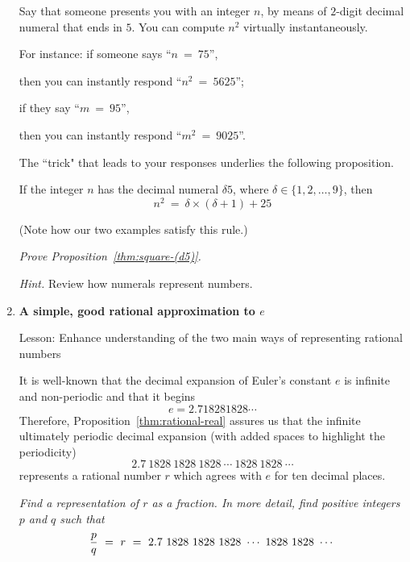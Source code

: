 \begin{enumerate}
\medskip

Say that someone presents you with an integer $n$, by means of $2$-digit decimal numeral that ends in $5$.  You can compute $n^2$ virtually instantaneously.  

\smallskip

For instance: if someone says ``$n \ = \ 75$'',

\hspace{.25in}then you can instantly respond ``$n^2 \ = \ 5625$'';

if they say ``$m \ = \ 95$'',

\hspace{.25in}then you can instantly respond ``$m^2 \ = \ 9025$''.

\medskip

The ``trick" that leads to your responses underlies the following proposition.

\begin{prop}
\label{thm:square-(d5)}
If the integer $n$ has the decimal numeral $\delta 5$, where $\delta \in \{1, 2, \ldots, 9\}$, then 
\[ n^2 \ = \ \delta \times (\delta+1) +25 \]
\end{prop}

(Note how our two examples satisfy this rule.)

\medskip

{\em Prove Proposition~\ref{thm:square-(d5)}.}

\smallskip

\textit{Hint.}
Review how numerals represent numbers.


\item
{\bf A simple, good rational approximation to $e$}

{\sc Lesson:} Enhance understanding of the two main ways of representing rational numbers

\smallskip

It is well-known that the decimal expansion of Euler's constant $e$ is infinite and non-periodic and that it begins
\[ e = 2.718281828 \cdots \]  
Therefore, Proposition~\ref{thm:rational-real} assures us that the infinite ultimately periodic decimal expansion (with added spaces to highlight the periodicity)
\[ 2.7 \ 1828 \ 1828 \ 1828 \ \cdots \ 1828 \ 1828 \ \cdots   \]
represents a rational number $r$ which agrees with $e$ for ten decimal places.

\smallskip

{\em Find a representation of $r$ as a fraction.  In more detail, find positive integers $p$ and $q$ such that}
\[ {p \over q} \ = \ r \ = \ 2.7 \ 1828 \ 1828 \ 1828 \ \cdots \ 1828 \ 1828 \ \cdots   \]

\end{enumerate}
